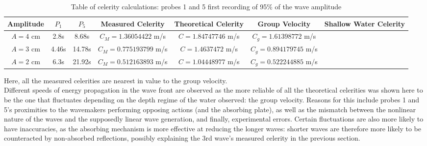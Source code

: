 \documentclass{article}
\begin{document}
	\begin{table}[H]
		\centering
		\begin{tabular}{|c|c|c|c|c|c|c|}
			\hline
			Amplitude & \textbf{$P_1$} & \textbf{$P_5$} & \textbf{Measured Celerity} & Theoretical Celerity & Group Velocity & Shallow Water Celerity\\ \hline
			$A = 4$ cm & 2.8s & 8.68s & $C_M = 1.36054422$ m/s & $C = 1.84747746$ m/s & $C_g = 1.61398772$ m/s &{\multirow{3}{*}{$C_s = 1.98057$ m/s}}\\ \cline{1-6}
			$A = 3$ cm & 4.46s & 14.78s & $C_M = 0.775193799$ m/s & $C = 1.4637472$ m/s & $C_g = 0.894179745$ m/s & {}\\ \cline{1-6}
			$A = 2$ cm & 6.3s & 21.92s & $C_M = 0.512163893$ m/s & $C = 1.04448977$ m/s & $C_g = 0.522244885$ m/s & {} \\ \hline
		\end{tabular}
		\caption{Table of celerity calculations: probes 1 and 5 first recording of 95\% of the wave amplitude}
		\label{largewavefronttable}
	\end{table}
	Here, all the measured celerities are nearest in value to the group velocity.\\
	Different speeds of energy propagation in the wave front are observed as the more reliable of all the theoretical celerities was shown here to be the one that fluctuates depending on the depth regime of the water observed: the group velocity. Reasons for this include probes 1 and 5's proximities to the wavemakers performing opposing actions (and the absorbing plate), as well as the mismatch between the nonlinear nature of the waves and the supposedly linear wave generation, and finally, experimental errors. Certain fluctuations are also more likely to have inaccuracies, as the absorbing mechanism is more effective at reducing the longer waves: shorter waves are therefore more likely to be counteracted by non-absorbed reflections, possibly explaining the 3rd wave's measured celerity in the previous section. 
\end{document}
